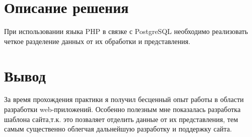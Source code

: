 \documentclass[a4paper]{article}
\begin{document}
\pagebreak

\section{Описание решения}
При использовании языка PHP в связке с PostgreSQL необходимо реализовать четкое разделение данных от их обработки и представления.

\section{Вывод}
За время прохождения практики я получил бесценный опыт работы в области разработки web-приложений. Особенно полезным мне показалась разработка шаблона сайта,т.к. это позваляет отделить данные от их представления, тем самым существенно облегчая дальнейшую разработку и поддержку сайта.
\end{document}
